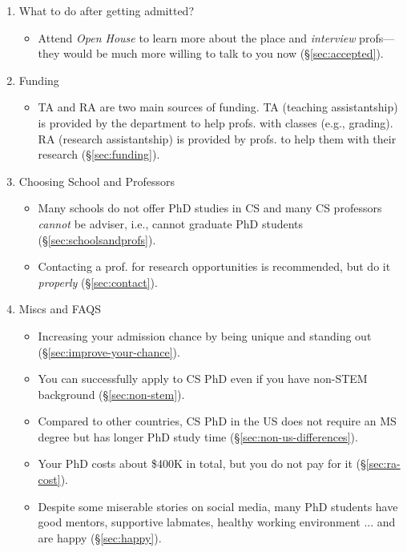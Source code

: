 \documentclass[oneside,11pt]{memoir}
\begin{document}
\begin{enumerate}
\begin{itemize}
\end{itemize}
\item What to do after getting admitted?
\begin{itemize}
    \item Attend \emph{Open House} to learn more about the place and \emph{interview} profs---they would be much more willing to talk to you now (\S\ref{sec:accepted}).
\end{itemize}
\item Funding
\begin{itemize}
    \item TA and RA are two main sources of funding.  TA (teaching assistantship) is provided by the department to help profs. with classes (e.g., grading). RA (research assistantship) is provided by profs. to help them with their research (\S\ref{sec:funding}).
\end{itemize}
\item Choosing School and Professors
\begin{itemize}
    \item Many schools do not offer PhD studies in CS and many CS professors \emph{cannot} be adviser, i.e., cannot graduate PhD students  (\S\ref{sec:schoolsandprofs}).
    \item Contacting a prof. for research opportunities is recommended, but do it \emph{properly} (\S\ref{sec:contact}).
\end{itemize}
\item Miscs and FAQS
\begin{itemize}
    \item Increasing your admission chance by being unique and standing out (\S\ref{sec:improve-your-chance}).
    \item You can successfully apply to CS PhD even if you have non-STEM background (\S\ref{sec:non-stem}).
    \item Compared to other countries, CS PhD in the US does not require an MS degree but has longer PhD study time (\S\ref{sec:non-us-differences}).
    \item Your PhD costs about \$400K in total, but you do not pay for it (\S\ref{sec:ra-cost}).
    \item Despite some miserable stories on social media, many PhD students have good mentors, supportive labmates, healthy working environment ... and are happy (\S\ref{sec:happy}).
\end{itemize}
\end{enumerate}
\end{document}
